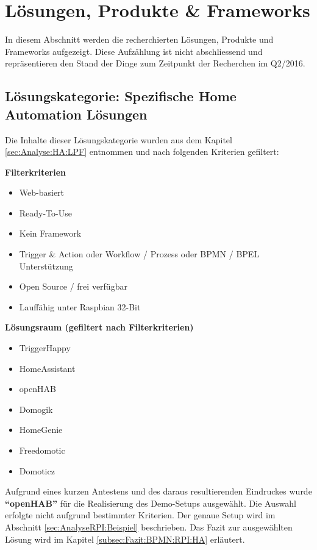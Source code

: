 \section{Lösungen, Produkte \& Frameworks }
In diesem Abschnitt werden die recherchierten Lösungen, Produkte und Frameworks aufgezeigt. Diese Aufzählung ist nicht abschliessend und repräsentieren den Stand der Dinge zum Zeitpunkt der Recherchen im Q2/2016.

\subsection{Lösungskategorie: Spezifische Home Automation Lösungen}
Die Inhalte dieser Lösungskategorie wurden aus dem Kapitel \ref{sec:Analyse:HA:LPF}  entnommen und nach folgenden Kriterien gefiltert:

\textbf{Filterkriterien}
\begin{itemize}
\item Web-basiert
\item Ready-To-Use
\item Kein Framework
\item Trigger \& Action oder Workflow  / Prozess oder BPMN / BPEL Unterstützung
\item Open Source / frei verfügbar
\item Lauffähig unter Raspbian 32-Bit
\end{itemize}

\textbf{Lösungsraum (gefiltert nach Filterkriterien)}
\begin{itemize}
\item TriggerHappy
\item HomeAssistant
\item openHAB
\item Domogik
\item HomeGenie
\item Freedomotic
\item Domoticz
\end{itemize}

Aufgrund eines kurzen Antestens und des daraus resultierenden Eindruckes wurde \textbf{"`openHAB"'} für die Realisierung des Demo-Setups ausgewählt. Die Auswahl erfolgte nicht aufgrund bestimmter Kriterien. Der genaue Setup wird im Abschnitt \ref{sec:AnalyseRPI:Beispiel}  beschrieben. Das Fazit zur ausgewählten Lösung wird im Kapitel \ref{subsec:Fazit:BPMN:RPI:HA}  erläutert.



